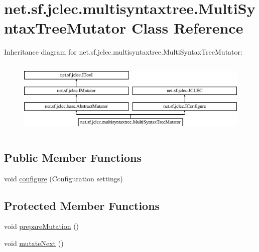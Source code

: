 \hypertarget{classnet_1_1sf_1_1jclec_1_1multisyntaxtree_1_1_multi_syntax_tree_mutator}{\section{net.\-sf.\-jclec.\-multisyntaxtree.\-Multi\-Syntax\-Tree\-Mutator Class Reference}
\label{classnet_1_1sf_1_1jclec_1_1multisyntaxtree_1_1_multi_syntax_tree_mutator}
}
Inheritance diagram for net.\-sf.\-jclec.\-multisyntaxtree.\-Multi\-Syntax\-Tree\-Mutator\-:\begin{figure}[H]
\begin{center}
\leavevmode
\includegraphics[height=3.648208cm]{classnet_1_1sf_1_1jclec_1_1multisyntaxtree_1_1_multi_syntax_tree_mutator}
\end{center}
\end{figure}
\subsection*{Public Member Functions}
\begin{DoxyCompactItemize}
\item 
void \hyperlink{classnet_1_1sf_1_1jclec_1_1multisyntaxtree_1_1_multi_syntax_tree_mutator_aa65bf77eb2b0b98e482c464047ec1f4f}{configure} (Configuration settings)
\end{DoxyCompactItemize}
\subsection*{Protected Member Functions}
\begin{DoxyCompactItemize}
\item 
void \hyperlink{classnet_1_1sf_1_1jclec_1_1multisyntaxtree_1_1_multi_syntax_tree_mutator_abc579c6ab91161c80f75e2f643b864ac}{prepare\-Mutation} ()
\item 
void \hyperlink{classnet_1_1sf_1_1jclec_1_1multisyntaxtree_1_1_multi_syntax_tree_mutator_a639c8a190fed6f77db9844dfce7a4f6c}{mutate\-Next} ()
\end{DoxyCompactItemize}
